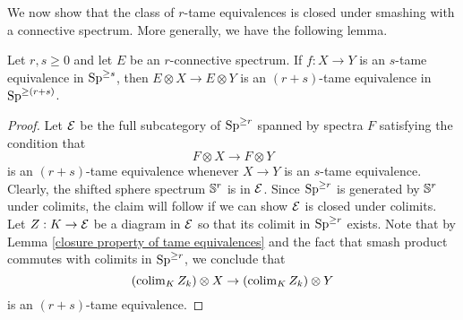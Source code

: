 We now show that the class of $r$-tame equivalences is closed under smashing with a connective spectrum. More generally, we have the following lemma.
\begin{lemma}
\label{Shift of tame equivalences}
Let $r,s\geq 0$ and
let $E$ be an $r$-connective spectrum. If $f:X\to Y$ is an $s$-tame equivalence in $\operatorname{Sp}^{\geq s}$, then $E\otimes X \to E\otimes Y$ is an $(r+s)$-tame equivalence in $\operatorname{Sp}^{\geq (r+s)}$.
\end{lemma}
\begin{proof}
Let ${\mathcal{E}}$ be the full subcategory of $\operatorname{Sp}^{\geq r}$ spanned by spectra $F$ satisfying the condition that
$$
F\otimes X \to F\otimes Y
$$
is an $(r+s)$-tame equivalence whenever $X\to Y$ is an $s$-tame equivalence. Clearly, the shifted sphere spectrum ${\mathbb{S}}^{r}$ is in ${\mathcal{E}}$. 
Since $\operatorname{Sp}^{\geq r}$ is generated by ${\mathbb{S}}^r$ under colimits, the claim will follow if we can show ${\mathcal{E}}$ is closed under colimits. Let $Z:K\to {\mathcal{E}}$ be a diagram in ${\mathcal{E}}$ so that its colimit in $\operatorname{Sp}^{\geq r}$ exists.
Note that by Lemma \ref{closure property of tame equivalences} and the fact that smash product commutes with colimits in $\operatorname{Sp}^{\geq r}$, we conclude that
$$
(\operatorname{colim}_K Z_k )\otimes X \to (\operatorname{colim}_K Z_k )\otimes Y
$$
is an $(r+s)$-tame equivalence.

\end{proof}

